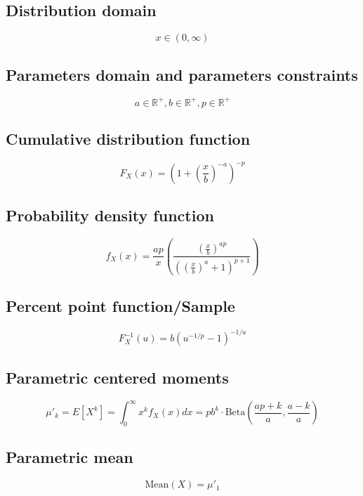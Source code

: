 \documentclass{article}
\begin{document}
\subsection{Distribution domain}
\begin{equation*} x\in\left(0,\infty\right) \end{equation*}
\subsection{Parameters domain and parameters constraints}
\begin{equation*} a\in\mathbb{R}^{+}, b\in\mathbb{R}^{+}, p\in\mathbb{R}^{+} \end{equation*}
\subsection{Cumulative distribution function}
\begin{equation*} F_{X}\left(x\right)={\left(1+{\left(\frac{x}{b}\right)}^{-a}\right)}^{-p} \end{equation*}
\subsection{Probability density function}
\begin{equation*} f_{X}\left(x\right)=\frac{a p}{x}\left(\frac{(\tfrac{x}{b})^{a p}}{\left((\tfrac{x}{b})^a+1\right)^{p+1}}\right) \end{equation*}
\subsection{Percent point function/Sample}
\begin{equation*} F^{-1}_{X}\left(u\right)=b(u^{-1/p}-1)^{-1/a} \end{equation*}
\subsection{Parametric centered moments}
\begin{equation*} \mu'_{k}=E[X^k]=\int_{0}^{\infty}x^{k}f_{X}\left(x\right)dx=pb^{k}\cdot \text{Beta}\left(\frac{ap+k}{a},\frac{a-k}{a}\right) \end{equation*}
\subsection{Parametric mean}
\begin{equation*} \mathrm{Mean}(X)=\mu'_{1} \end{equation*}
\end{document}
